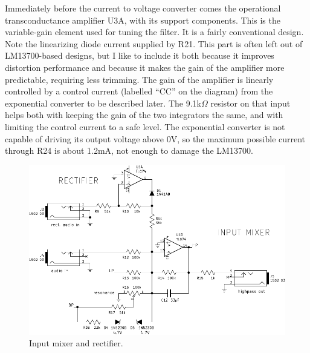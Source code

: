 Immediately before the current to voltage converter comes the operational
transconductance amplifier U3A, with its support components.  This is the
variable-gain element used for tuning the filter.  It is a fairly
conventional design.  Note the linearizing diode current supplied by R21. 
This part is often left out of LM13700-based designs, but I like to include
it both because it improves distortion performance and because it makes the
gain of the amplifier more predictable, requiring less trimming.  The gain
of the amplifier is linearly controlled by a control current (labelled
``CC'' on the diagram) from the exponential converter to be described later. 
The 9.1k$\Omega$ resistor on that input helps both with keeping the gain of
the two integrators the same, and with limiting the control current to a
safe level.  The exponential converter is not capable of driving its output
voltage above 0V, so the maximum possible current through R24 is about
1.2mA, not enough to damage the LM13700.

\begin{figure}
\centering\includegraphics[scale=0.8]{input.pdf}\par
\caption{Input mixer and rectifier.}\label{fig:input}
\end{figure}

